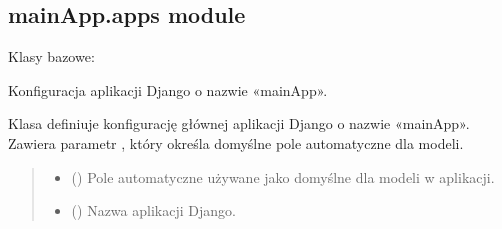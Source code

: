 \documentclass[letterpaper,10pt,polish]{sphinxmanual}
\begin{document}
\subsection{mainApp.apps module}
\label{\detokenize{mainApp:module-mainApp.apps}}\label{\detokenize{mainApp:mainapp-apps-module}}

\begin{fulllineitems}
\label{\detokenize{mainApp:mainApp.apps.MainappConfig}}
\pysigstartsignatures
{}
\pysigstopsignatures
\sphinxAtStartPar
Klasy bazowe: 

\sphinxAtStartPar
Konfiguracja aplikacji Django o nazwie «mainApp».

\sphinxAtStartPar
Klasa  definiuje konfigurację głównej aplikacji Django o nazwie «mainApp».
Zawiera parametr , który określa domyślne pole automatyczne dla modeli.
\begin{quote}\begin{description}
\begin{itemize}
\item {} 
\sphinxAtStartPar
{} () \textendash{} Pole automatyczne używane jako domyślne dla modeli w aplikacji.

\item {} 
\sphinxAtStartPar
{} () \textendash{} Nazwa aplikacji Django.

\end{itemize}

\end{description}\end{quote}

\begin{fulllineitems}
\label{\detokenize{mainApp:mainApp.apps.MainappConfig.default_auto_field}}
\pysigstartsignatures
{}
\pysigstopsignatures
\end{fulllineitems}


\end{fulllineitems}
\end{document}
